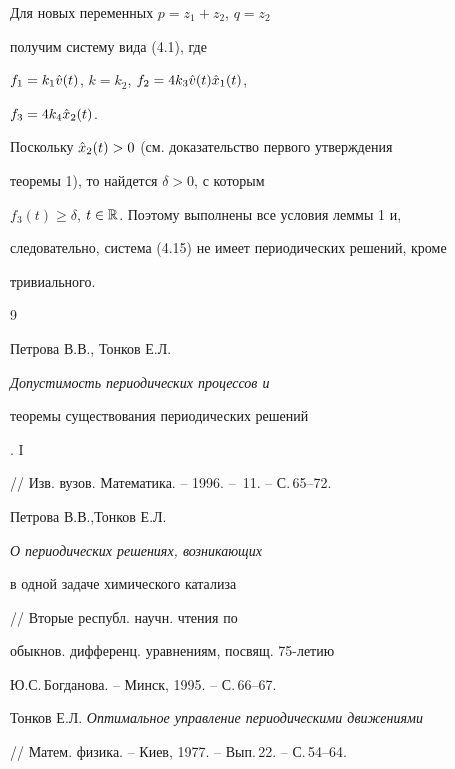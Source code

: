 %


Для новых переменных $p=z_1 + z_2$, $q=z_2$


получим систему вида (4.1), где


$f_1=k_1\Hat v(t)$, $k=k_2$, $f_2=4k_3\Hat v(t)\Hat x_1(t)$,


$f_3=4k_4\Hat x_2(t)$.


Поскольку $\Hat x_2(t) > 0$ (см. доказательство первого утверждения


теоремы 1), то найдется $\delta > 0$, с которым


$f_3(t)\ge \delta$, $t\in \Bbb R$. Поэтому выполнены все условия леммы 1 и,


следовательно, система (4.15) не имеет периодических решений, кроме


тривиального.





\begin{thebibliography}{9} 


 




Петрова В.В., Тонков Е.Л. {\em Допустимость периодических процессов и


теоремы существования периодических решений}. I


// Изв. вузов. Математика. -- 1996. -- \No\,11. -- С.\,65--72.







Петрова В.В.,Тонков Е.Л. {\em О периодических решениях, возникающих


в одной задаче химического катализа}


// Вторые республ. научн. чтения по


обыкнов. дифференц. уравнениям, посвящ. 75-летию


Ю.С.\,Богданова. -- Минск, 1995. -- С.\,66--67.







Тонков Е.Л. {\em Оптимальное управление периодическими движениями}


// Матем. физика. -- Киев, 1977. -- Вып.\,22. -- С.\,54--64.





\end{thebibliography} 


 


\vskip 2cm 


 






 


 


